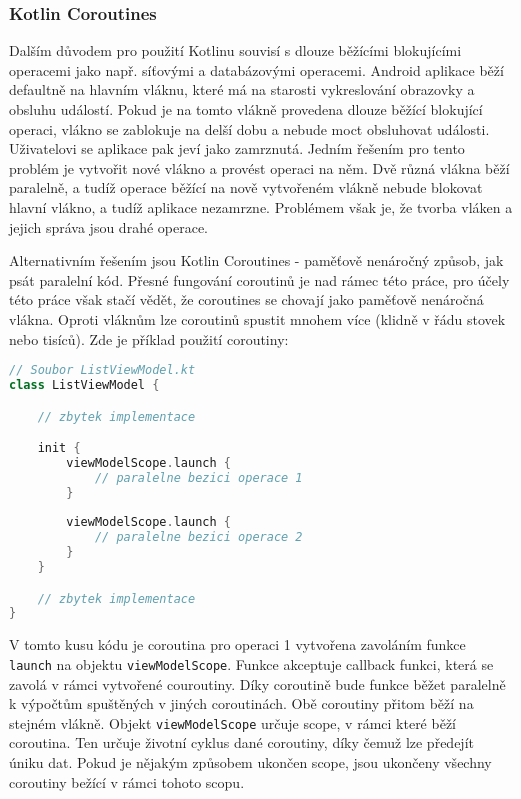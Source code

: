 \subsubsection*{Kotlin Coroutines}

\noindent Dalším důvodem pro použití Kotlinu souvisí s dlouze běžícími blokujícími operacemi jako např. síťovými a databázovými operacemi. Android aplikace běží defaultně na hlavním vláknu, které má na starosti vykreslování obrazovky a obsluhu událostí. Pokud je na tomto vlákně provedena dlouze běžící blokující operaci, vlákno se zablokuje na delší dobu a nebude moct obsluhovat události. Uživatelovi se aplikace pak jeví jako zamrznutá. Jedním řešením pro tento problém je vytvořit nové vlákno a provést operaci na něm. Dvě různá vlákna běží paralelně, a tudíž operace běžící na nově vytvořeném vlákně nebude blokovat hlavní vlákno, a tudíž aplikace nezamrzne. Problémem však je, že tvorba vláken a jejich správa jsou drahé operace. 

Alternativním řešením jsou Kotlin Coroutines - paměťově nenáročný způsob, jak psát paralelní kód. Přesné fungování coroutinů je nad rámec této práce, pro účely této práce však stačí vědět, že coroutines se chovají jako paměťově nenáročná vlákna. Oproti vláknům lze coroutinů spustit mnohem více (klidně v řádu stovek nebo tisíců). Zde je příklad použití coroutiny:

\newpage

\begin{lstlisting}[caption={Příklad použití coroutiny}, label={lst:coroutine-example}, tabsize=2, language=Kotlin]
// Soubor ListViewModel.kt
class ListViewModel {

	// zbytek implementace

	init {
		viewModelScope.launch {
			// paralelne bezici operace 1
		}
		
		viewModelScope.launch {
			// paralelne bezici operace 2
		}
	}

	// zbytek implementace
}
\end{lstlisting}

\noindent V tomto kusu kódu je coroutina pro operaci 1 vytvořena zavoláním funkce \lstinline|launch| na objektu \lstinline|viewModelScope|. Funkce akceptuje callback funkci, která se zavolá v rámci vytvořené couroutiny. Díky coroutině bude funkce běžet paralelně k výpočtům spuštěných v jiných coroutinách. Obě coroutiny přitom běží na stejném vlákně. Objekt \lstinline|viewModelScope| určuje scope, v rámci které běží coroutina. Ten určuje životní cyklus dané coroutiny, díky čemuž lze předejít úniku dat. Pokud je nějakým způsobem ukončen scope, jsou ukončeny všechny coroutiny bežící v rámci tohoto scopu.

